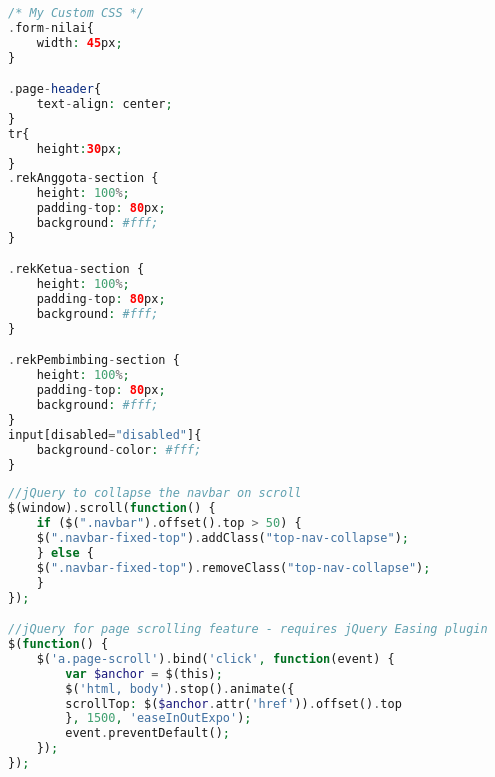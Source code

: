 \begin{lstlisting}[language=PHP,basicstyle=\tiny,caption=custom.css]
/* My Custom CSS */
.form-nilai{
	width: 45px;
}

.page-header{
	text-align: center;
}
tr{
	height:30px;
}
.rekAnggota-section {
	height: 100%;
	padding-top: 80px;
	background: #fff;
}

.rekKetua-section {
	height: 100%;
	padding-top: 80px;
	background: #fff;
}

.rekPembimbing-section {
	height: 100%;
	padding-top: 80px;
	background: #fff;
}
input[disabled="disabled"]{
	background-color: #fff;
}

\end{lstlisting}

\begin{lstlisting}[language=PHP,basicstyle=\tiny,caption=scrolling-nav.js]
//jQuery to collapse the navbar on scroll
$(window).scroll(function() {
	if ($(".navbar").offset().top > 50) {
	$(".navbar-fixed-top").addClass("top-nav-collapse");
	} else {
	$(".navbar-fixed-top").removeClass("top-nav-collapse");
	}
});

//jQuery for page scrolling feature - requires jQuery Easing plugin
$(function() {
	$('a.page-scroll').bind('click', function(event) {
		var $anchor = $(this);
		$('html, body').stop().animate({
		scrollTop: $($anchor.attr('href')).offset().top
		}, 1500, 'easeInOutExpo');
		event.preventDefault();
	});
});

\end{lstlisting}